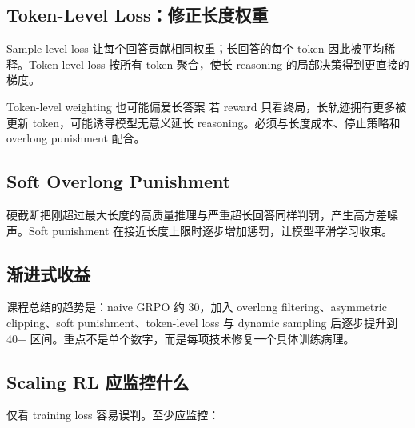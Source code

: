 \subsection{Token-Level Loss：修正长度权重}

Sample-level loss 让每个回答贡献相同权重；长回答的每个 token 因此被平均稀释。Token-level loss 按所有 token 聚合，使长 reasoning 的局部决策得到更直接的梯度。


\begin{warningbox}{Token-level weighting 也可能偏爱长答案}
若 reward 只看终局，长轨迹拥有更多被更新 token，可能诱导模型无意义延长 reasoning。必须与长度成本、停止策略和 overlong punishment 配合。
\end{warningbox}

\subsection{Soft Overlong Punishment}

硬截断把刚超过最大长度的高质量推理与严重超长回答同样判罚，产生高方差噪声。Soft punishment 在接近长度上限时逐步增加惩罚，让模型平滑学习收束。


\subsection{渐进式收益}


课程总结的趋势是：naive GRPO 约 30，加入 overlong filtering、asymmetric clipping、soft punishment、token-level loss 与 dynamic sampling 后逐步提升到 40+ 区间。重点不是单个数字，而是每项技术修复一个具体训练病理。

\subsection{Scaling RL 应监控什么}


仅看 training loss 容易误判。至少应监控：

